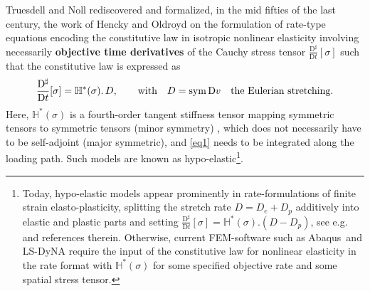 \documentclass[10pt]{article}
\numberwithin{theoremCounter}{section}
\theoremstyle{plain}
\theoremstyle{definition}
\newcommand{\DD}{\mathrm{D}}
\DeclareMathOperator{\sym}{sym}
\def\H{\mathbb{H}}
\numberwithin{equation}{section}
\begin{document}
Truesdell and Noll rediscovered and formalized, in the mid fifties of the last century, the work of Hencky \cite{biezeno1928, Hencky1928, Hencky1929} and Oldroyd \cite{oldroyd1950} on the formulation of rate-type equations encoding the constitutive law in isotropic nonlinear elasticity involving necessarily {\bf objective time derivatives} \cite{Marsden83} of the Cauchy stress tensor $\frac{\DD^{\sharp}}{\DD t}[\sigma]$ such that the constitutive law is expressed as
	\begin{align}\label{eq1}
	\frac{\DD^{\sharp}}{\DD t}[\sigma] =\H^*(\sigma).\, D, \qquad \textnormal{with} \quad D = \sym \DD v \quad \textnormal{the Eulerian stretching}.
	\end{align}
Here, $\H^*(\sigma)$ is a fourth-order tangent stiffness tensor mapping symmetric tensors to symmetric tensors (minor symmetry) \cite{ericksen1958hypo, xiao97_2}, which does not necessarily have to be self-adjoint (major symmetric), and \eqref{eq1} needs to be integrated along the loading path. Such models are known as hypo-elastic\footnote
{
Today, hypo-elastic models appear prominently in rate-formulations of finite strain elasto-plasticity, splitting the stretch rate $D = D_e + D_p$ additively into elastic and plastic parts and setting $\frac{\DD^{\sharp}}{\DD t}[\sigma] = \H^*(\sigma).(D - D_p)$, see e.g.~\cite{baghani2014, bruhns1999, eshraghi2013, peshkov2019, volokh2013} and references therein. Otherwise, current FEM-software such as Abaqus\texttrademark\ and LS-DyNA require the input of the constitutive law for nonlinear elasticity in the rate format with $\H^*(\sigma)$ for some specified objective rate and some spatial stress tensor.
}.
\end{document}
